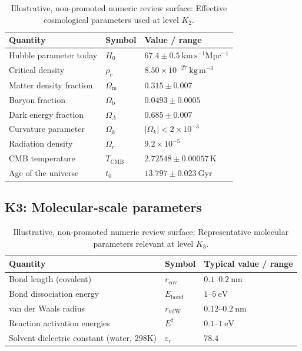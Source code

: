 \begin{table}[h]
  \centering
  \caption{Illustrative, non-promoted numeric review surface: Effective cosmological parameters used at level \(K_2\).}
  \label{tab:k2-cosmological-parameters}
  \begin{tabular}{lll}
    \hline
    Quantity & Symbol & Value / range \\
    \hline
    Hubble parameter today & \(H_0\)
        & \(67.4 \pm 0.5 ~ \mathrm{km\,s^{-1}Mpc^{-1}}\) \\
    Critical density       & \(\rho_c\)
        & \(8.50 \times 10^{-27} ~ \mathrm{kg\,m^{-3}}\) \\
    Matter density fraction & \(\Omega_\mathrm{m}\)
        & \(0.315 \pm 0.007\) \\
    Baryon fraction         & \(\Omega_\mathrm{b}\)
        & \(0.0493 \pm 0.0005\) \\
    Dark energy fraction    & \(\Omega_\Lambda\)
        & \(0.685 \pm 0.007\) \\
    Curvature parameter     & \(\Omega_k\)
        & \(|\Omega_k| < 2 \times 10^{-3}\) \\
    Radiation density       & \(\Omega_r\)
        & \(9.2 \times 10^{-5}\) \\
    CMB temperature         & \(T_\mathrm{CMB}\)
        & \(2.72548 \pm 0.00057 \,\mathrm{K}\) \\
    Age of the universe     & \(t_0\)
        & \(13.797 \pm 0.023 ~ \mathrm{Gyr}\) \\
    \hline
  \end{tabular}
\end{table}


\subsection*{K3: Molecular-scale parameters}

\begin{table}[h]
  \centering
  \caption{Illustrative, non-promoted numeric review surface: Representative molecular parameters relevant at level \(K_3\).}
  \label{tab:k3-molecular-parameters}
  \begin{tabular}{lll}
    \hline
    Quantity & Symbol & Typical value / range \\
    \hline
    Bond length (covalent) & \(r_\mathrm{cov}\)
        & \(0.1\text{–}0.2~\mathrm{nm}\) \\
    Bond dissociation energy & \(E_\mathrm{bond}\)
        & \(1\text{–}5~\mathrm{eV}\) \\
    van der Waals radius & \(r_\mathrm{vdW}\)
        & \(0.12\text{–}0.2~\mathrm{nm}\) \\
    Reaction activation energies & \(E^\ddagger\)
        & \(0.1\text{–}1~\mathrm{eV}\) \\
    Solvent dielectric constant (water, 298K)
        & \(\varepsilon_r\)
        & \(78.4\) \\
    \hline
  \end{tabular}
\end{table}

